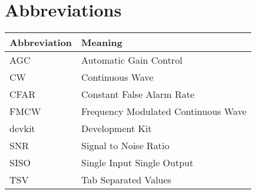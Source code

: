
\chapter*{Abbreviations}


\begin{center}
  \begin{tabular}{| m{4cm}| m{9cm} | }
    \hline
		\textbf{Abbreviation} & \textbf{Meaning} \\
    \hline
    \hline
		AGC & Automatic Gain Control \\
		CW & Continuous Wave \\
		CFAR & Constant False Alarm Rate \\
		FMCW & Frequency Modulated Continuous Wave \\
		devkit & Development Kit \\
		SNR & Signal to Noise Ratio \\
		SISO & Single Input Single Output \\
		TSV & Tab Separated Values \\
    \hline
  \end{tabular}

\end{center}
